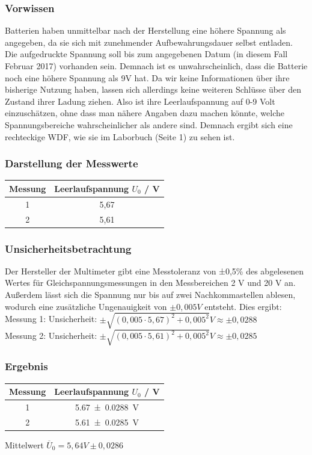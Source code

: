 \documentclass[
	a4paper,
	12pt,
	pagesize,
	ngerman
]{scrartcl}
\begin{document}
	\subsubsection{Vorwissen}
	Batterien haben unmittelbar nach der Herstellung eine höhere Spannung als angegeben, da sie sich mit zunehmender Aufbewahrungsdauer selbst entladen. Die aufgedruckte Spannung soll bis zum angegebenen Datum (in diesem Fall Februar 2017) vorhanden sein. Demnach ist es unwahrscheinlich, dass die Batterie noch eine höhere Spannung als 9V hat. Da wir keine Informationen über ihre bisherige Nutzung haben, lassen sich allerdings keine weiteren Schlüsse über den Zustand ihrer Ladung ziehen. Also ist ihre Leerlaufspannung auf 0-9 Volt einzuschätzen, ohne dass man nähere Angaben dazu machen könnte, welche Spannungsbereiche wahrscheinlicher als andere sind. Demnach ergibt sich eine rechteckige WDF, wie sie im Laborbuch (Seite 1) zu sehen ist. 
	\subsubsection{Darstellung der Messwerte}
	\begin{tabular}{| c | c |}
		\hline
		Messung & Leerlaufspannung $U_0$ / \si{V}\\ \hline
		1 & 5,67\\
		2 & 5,61\\ \hline
	\end{tabular}
	\subsubsection{Unsicherheitsbetrachtung}
	Der Hersteller der Multimeter gibt eine Messtoleranz von ±0,5\% des abgelesenen Wertes für Gleichspannungsmessungen in den Messbereichen 2 V und 20 V an. Außerdem lässt sich die Spannung nur bis auf zwei Nachkommastellen ablesen, wodurch eine zusätzliche Ungenauigkeit von $\pm 0,005\si{V}$ entsteht. Dies ergibt: \\
	Messung 1: Unsicherheit: $\pm \sqrt{(0,005\cdot 5,67)^2 + 0,005^2} \si{V} \approx \pm 0,0288$ \\
	Messung 2: Unsicherheit: $\pm \sqrt{(0,005\cdot 5,61)^2 + 0,005^2} \si{V} \approx \pm 0,0285$ 
	
	\subsubsection{Ergebnis}
	\begin{tabular}{| c | c |}
		\hline
	Messung & Leerlaufspannung $U_0$ / \si{V}\\ \hline
	1 & \SI{5,67 +- 0,0288}{\V}\\ %
	2 & \SI{5,61 +- 0,0285}{\V}\\ \hline
	\end{tabular}
	Mittelwert $\overline{U}_0=5,64\si{V} \pm 0,0286$
\end{document}
